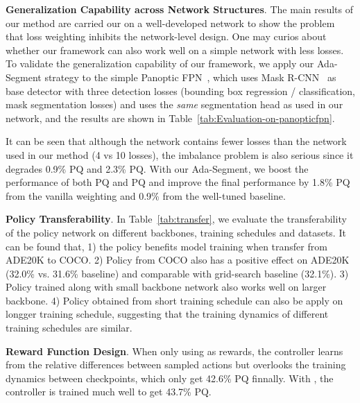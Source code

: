 \documentclass[letterpaper]{article} \usepackage{aaai21}  \usepackage{times}  \usepackage{helvet} \usepackage{courier}  \usepackage[hyphens]{url}  \usepackage{graphicx} \urlstyle{rm} \def\UrlFont{\rm}  \usepackage{natbib}  \usepackage{caption} \frenchspacing  \setlength{\pdfpagewidth}{8.5in}  \setlength{\pdfpageheight}{11in}
\begin{document}
 \noindent
 \textbf{Generalization Capability across Network Structures}. 
 The main results of our method are carried our on a well-developed network to show the problem
 that loss weighting inhibits the network-level design. 
 One may curios about whether our framework can also work well on a simple network with less losses.
 To validate the generalization capability of our framework, 
 we apply our Ada-Segment strategy to the simple Panoptic FPN~\cite{panopticFPNkirillov2019},
 which uses Mask R-CNN~\cite{he2017mask} as base detector with three detection losses 
 (bounding box regression / classification, mask segmentation losses) and uses the \textit{same}
 segmentation head as used in our network, 
 and the results are shown in Table~\ref{tab:Evaluation-on-panopticfpn}.


It can be seen that although the network contains fewer losses than the network used 
 in our method (4 vs 10 losses), the imbalance problem is also serious since it degrades 0.9\% PQ 
 and 2.3\% PQ. 
 With our Ada-Segment, we boost the performance of both PQ and PQ 
 and improve the final performance by 1.8\% PQ from the vanilla weighting and 0.9\% from the well-tuned baseline. 




 \noindent
 \textbf{Policy Transferability}.  
In Table~\ref{tab:transfer}, we evaluate the transferability of the policy network
 on different backbones, training schedules and datasets.
It can be found that, 
 1) the policy benefits model training when transfer from ADE20K to COCO.
2) Policy from COCO also has a positive effect on ADE20K (32.0\% vs. 31.6\% baseline) and 
 comparable with grid-search baseline (32.1\%). 
3) Policy trained along with small backbone network also works well on larger backbone.
 4) Policy obtained from short training schedule can also be apply on longger training schedule, suggesting
 that the training dynamics of different training schedules are similar. 


 \noindent
 \textbf{Reward Function Design}.
When only using  as rewards, the controller learns from the relative differences between 
 sampled actions but overlooks the training dynamics between checkpoints, which only get 
 42.6\% PQ finnally.
 With , the controller is trained much well to get 43.7\% PQ. 
\end{document}
